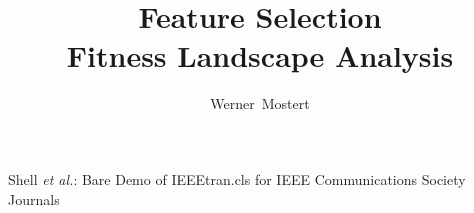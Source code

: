 \documentclass[journal,comsoc]{IEEEtran}
\begin{document}
%
\title{Feature Selection\\ Fitness Landscape Analysis}
%
%
%

\author{Werner~Mostert}%

% 
%



%
{Shell \MakeLowercase{\textit{et al.}}: Bare Demo of IEEEtran.cls for IEEE Communications Society Journals}
% 
\end{document}
